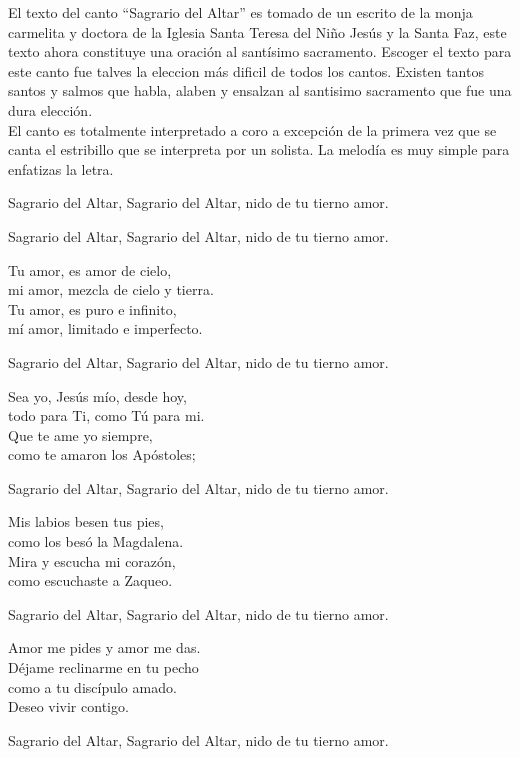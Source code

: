 \documentclass[12pt, letterpaper]{report}
\begin{document}
    \Large El texto del canto ``Sagrario del Altar'' es tomado de un escrito de la monja carmelita y doctora de la Iglesia Santa Teresa del Ni\~no Jes\'us y la Santa Faz, este texto ahora constituye una oraci\'on al sant\'isimo sacramento. Escoger el texto para este canto fue talves la eleccion m\'as dificil de todos los cantos. Existen tantos santos y salmos que habla, alaben y ensalzan al santisimo sacramento que fue una dura elecci\'on.\\
    El canto es totalmente interpretado a coro a excepci\'on de la primera vez que se canta el estribillo que se interpreta por un solista. La melod\'ia es muy simple para enfatizas la letra.

    \noindent
    \LARGE Sagrario del Altar, Sagrario del Altar, nido de tu tierno amor.

    \noindent
    Sagrario del Altar, Sagrario del Altar, nido de tu tierno amor.

    \noindent
    Tu amor, es amor de cielo,\\
    mi amor, mezcla de cielo y tierra.\\
    Tu amor, es puro e infinito,\\
    m\'i amor, limitado e imperfecto.

    \noindent
    Sagrario del Altar, Sagrario del Altar, nido de tu tierno amor.

    \noindent
    Sea yo, Jes\'us m\'io, desde hoy,\\
    todo para Ti, como T\'u para mi.\\
    Que te ame yo siempre,\\
    como te amaron los Ap\'ostoles;

    \noindent
    Sagrario del Altar, Sagrario del Altar, nido de tu tierno amor.

    \noindent
    Mis labios besen tus pies,\\
    como los bes\'o la Magdalena.\\
    Mira y escucha mi coraz\'on,\\
    como escuchaste a Zaqueo.

    \noindent
    Sagrario del Altar, Sagrario del Altar, nido de tu tierno amor.

    \noindent
    Amor me pides y amor me das.\\
    D\'ejame reclinarme en tu pecho\\
    como a tu disc\'ipulo amado.\\
    Deseo vivir contigo.

    \noindent
    Sagrario del Altar, Sagrario del Altar, nido de tu tierno amor.
\end{document}
